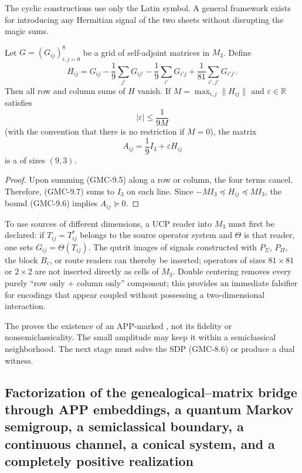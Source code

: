 The cyclic constructions use only the Latin symbol. A general framework
exists for introducing any Hermitian signal of the two sheets without
disrupting the magic sums.

\begin{proposition}
\label{gmc:prop:doble-centrado}
Let $G=(G_{ij})_{i,j=0}^{8}$ be a grid of self-adjoint matrices in
$M_3$. Define
\[
 H_{ij}=G_{ij}
 -\frac19\sum_{j'}G_{ij'}
 -\frac19\sum_{i'}G_{i'j}
 +\frac1{81}\sum_{i',j'}G_{i'j'}.
 \tag{GMC-9.5}
\]
Then all row and column sums of $H$ vanish. If
$M=\max_{i,j}\|H_{ij}\|$ and $\varepsilon\in\mathbb R$ satisfies
\[
 |\varepsilon|\le\frac1{9M}
 \tag{GMC-9.6}
\]
(with the convention that there is no restriction if $M=0$), the matrix
\[
 A_{ij}=\frac19I_3+\varepsilon H_{ij}
 \tag{GMC-9.7}
\]
is a \QMS of sizes $(9,3)$.
\end{proposition}

\begin{proof}
Upon summing \textup{(GMC-9.5)} along a row or column, the four terms cancel.
Therefore, \textup{(GMC-9.7)} sums to $I_3$ on each line. Since
$-MI_3\preceq H_{ij}\preceq MI_3$, the bound \textup{(GMC-9.6)} implies
$A_{ij}\succeq0$.
\end{proof}

To use sources of different dimensions, a UCP reader into $M_3$ must first be declared: if $T_{ij}=T_{ij}^*$ belongs to the source operator system and $\Theta$ is that reader, one sets $G_{ij}=\Theta(T_{ij})$. The qutrit images of signals constructed with $P_\Sigma$, $P_\Pi$, the block $B_c$, or route readers can thereby be inserted; operators of sizes $81\times81$ or $2\times2$ are not inserted directly as cells of $M_3$. Double centering removes every purely ``row only + column only'' component; this provides an immediate falsifier for encodings that appear coupled without possessing a two-dimensional interaction.

\begin{controlbox}
The  proves the existence of an APP-marked \QMS,
not its fidelity or nonsemiclassicality. The small amplitude may keep it
within a semiclassical neighborhood. The next stage must solve the SDP
\textup{(GMC-8.6)} or produce a dual witness.
\end{controlbox}

\subsection{Factorization of the genealogical--matrix bridge through APP embeddings, a quantum Markov semigroup, a semiclassical boundary, a continuous channel, a conical system, and a completely positive realization}

